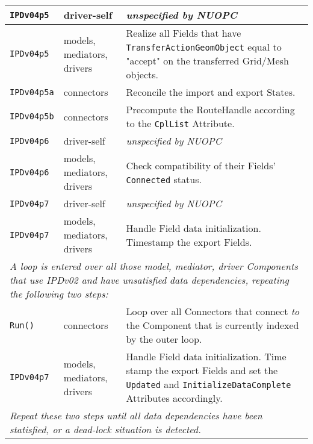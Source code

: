 \begin{longtable}[h]{|p{35mm}|p{4cm}|p{6cm}|}
     {\tt IPDv04p5}   & driver-self                 & {\em unspecified by NUOPC}\\ \hline
     {\tt IPDv04p5}   & models, mediators, drivers  & Realize all Fields that have {\tt TransferActionGeomObject} equal to "accept" on the transferred Grid/Mesh objects.\\ \hline
     {\tt IPDv04p5a}  & connectors                  & Reconcile the import and export States.\\ \hline
     {\tt IPDv04p5b}  & connectors                  & Precompute the RouteHandle according to the {\tt CplList} Attribute.\\ \hline
     {\tt IPDv04p6}   & driver-self                 & {\em unspecified by NUOPC}\\ \hline
     {\tt IPDv04p6}   & models, mediators, drivers  & Check compatibility of their Fields' {\tt Connected} status.\\ \hline
     {\tt IPDv04p7}   & driver-self                 & {\em unspecified by NUOPC}\\ \hline
     {\tt IPDv04p7}   & models, mediators, drivers  & Handle Field data initialization. Timestamp the export Fields.\\ \hline
     \multicolumn{3}{|p{13.5cm}|}{\it A loop is entered over all those model, mediator, driver Components that use IPDv02 and have
     unsatisfied data dependencies, repeating the following two steps:}\\ \hline
     {\tt Run()}      & connectors                  & Loop over all Connectors that connect {\it to} the Component that is currently indexed by the outer loop.\\ \hline
     {\tt IPDv04p7}   & models, mediators, drivers  & Handle Field data initialization. Time stamp the export Fields and set the {\tt Updated} and {\tt InitializeDataComplete} Attributes accordingly.\\ \hline
     \multicolumn{3}{|p{13.5cm}|}{\it Repeat these two steps until all data
     dependencies have been statisfied, or a dead-lock situation is detected.}\\ 
     \hline\hline
\end{longtable}
